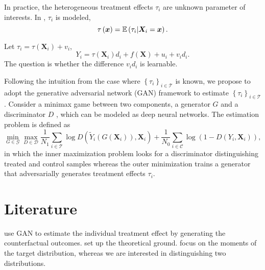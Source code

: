 In practice, the heterogeneous treatment effects \(\tau _{i} \) are unknown parameter of interests. In \citet{wager/athey:2018:rf_hte}, \(\tau _{i} \) is modeled,
\[
    \tau \left( \bm{x} \right)  = \mathbb{E} \left( \tau _{i} \vert \bm{X}_{i} = \bm{x} \right).
\]
\begin{remark}
    Let \(\tau _{i}  = \tau \left( \bm{X}_{i}  \right) + v _{i} \),
    \begin{equation*}
        Y _{i}  = \tau \left( \bm{X} _{i}  \right) d_{i} + f \left( \bm{X} \right) + u_{i} + v_{i} d _{i}.  
    \end{equation*}
    The question is whether the difference \(v_{i} d_{i} \) is learnable.
\end{remark}

Following the intuition from the case where \(\left\{ \tau _{i}  \right\}_{i \in \mathcal{T} }\) is known, we propose to adopt the generative adversarial network (GAN) framework \citep{goodfellow:2014:GAN,kaji/manresa/pouliot:2022:adversarial_est} to estimate \(\left\{ \tau _{i}  \right\} _{i\in \mathcal{T} }\). Consider a minimax game between two components, a generator \(G\)  and a discriminator \(D\) , which can be modeled as deep neural networks. The estimation problem is defined as
\begin{equation}
    \min_{G\in \mathcal{G} } \max_{D \in \mathcal{D} } 
    \frac{1}{N_{1}} \sum_{i \in \mathcal{T} } 
        \log D\left( \tilde{Y} _{i} \left( G\left( \bm{X} _{i}  \right)  \right), \bm{X} _{i}  \right) + 
    \frac{1}{N_{0}} \sum_{i\in \mathcal{C} } \log \left( 
        1 - D\left( Y _{i} , \bm{X} _{i}  \right)
     \right),
\end{equation}
in which the inner maximization problem looks for a discriminator distinguishing treated and control samples whereas the outer minimization trains a generator that adversarially generates treatment effects \(\tau _{i} \). 

\section{Literature}

\citet{yoon/jordan/vanderschaar:2018:ganite} use GAN to estimate the individual treatment effect by generating the counterfactual outcomes. \citet{liang2021well,liang:2021:gan_distribution,liang:2018:gan_density} set up the theoretical ground. \citet{liang:2021:gan_distribution} focus on the moments of the target distribution, whereas we are interested in distinguishing two distributions.

